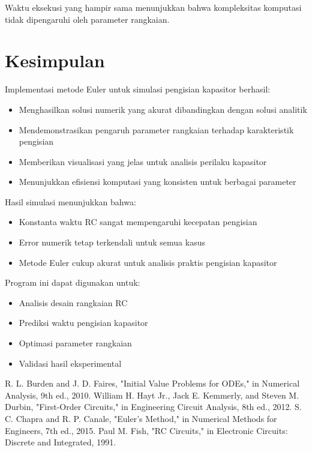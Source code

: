 \documentclass[conference]{IEEEtran}
\begin{document}
Waktu eksekusi yang hampir sama menunjukkan bahwa kompleksitas komputasi tidak dipengaruhi oleh parameter rangkaian.

\section{Kesimpulan}
Implementasi metode Euler untuk simulasi pengisian kapasitor berhasil:
\begin{itemize}
\item Menghasilkan solusi numerik yang akurat dibandingkan dengan solusi analitik
\item Mendemonstrasikan pengaruh parameter rangkaian terhadap karakteristik pengisian
\item Memberikan visualisasi yang jelas untuk analisis perilaku kapasitor
\item Menunjukkan efisiensi komputasi yang konsisten untuk berbagai parameter
\end{itemize}

Hasil simulasi menunjukkan bahwa:
\begin{itemize}
\item Konstanta waktu RC sangat mempengaruhi kecepatan pengisian
\item Error numerik tetap terkendali untuk semua kasus
\item Metode Euler cukup akurat untuk analisis praktis pengisian kapasitor
\end{itemize}

Program ini dapat digunakan untuk:
\begin{itemize}
\item Analisis desain rangkaian RC
\item Prediksi waktu pengisian kapasitor
\item Optimasi parameter rangkaian
\item Validasi hasil eksperimental
\end{itemize}

\begin{thebibliography}{00}
 R. L. Burden and J. D. Faires, "Initial Value Problems for ODEs," in Numerical Analysis, 9th ed., 2010.
 William H. Hayt Jr., Jack E. Kemmerly, and Steven M. Durbin, "First-Order Circuits," in Engineering Circuit Analysis, 8th ed., 2012.
 S. C. Chapra and R. P. Canale, "Euler's Method," in Numerical Methods for Engineers, 7th ed., 2015.
 Paul M. Fish, "RC Circuits," in Electronic Circuits: Discrete and Integrated, 1991.
\end{thebibliography}
\end{document}
